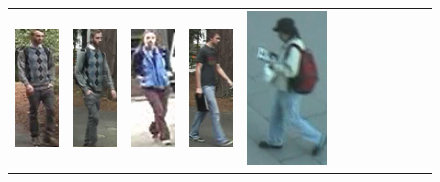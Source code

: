 \newlength\reidheight
\setlength{\reidheight}{2.5cm}
\addtolength{\tabcolsep}{-3pt}
\begin{figure}
\centering
\begin{tabular}{cccc|cccc|cccc}
\includegraphics[height=\reidheight]{Chapters/gradrev/figures/dataset_samples/viper/a/000_45.png}&
\includegraphics[height=\reidheight]{Chapters/gradrev/figures/dataset_samples/viper/b/000_45.png}&
\includegraphics[height=\reidheight]{Chapters/gradrev/figures/dataset_samples/viper/a/001_45.png}&
\includegraphics[height=\reidheight]{Chapters/gradrev/figures/dataset_samples/viper/b/002_90.png}&
\includegraphics[height=\reidheight]{Chapters/gradrev/figures/dataset_samples/PRID/a/img_0001.png}&

\end{tabular}
\end{figure}
